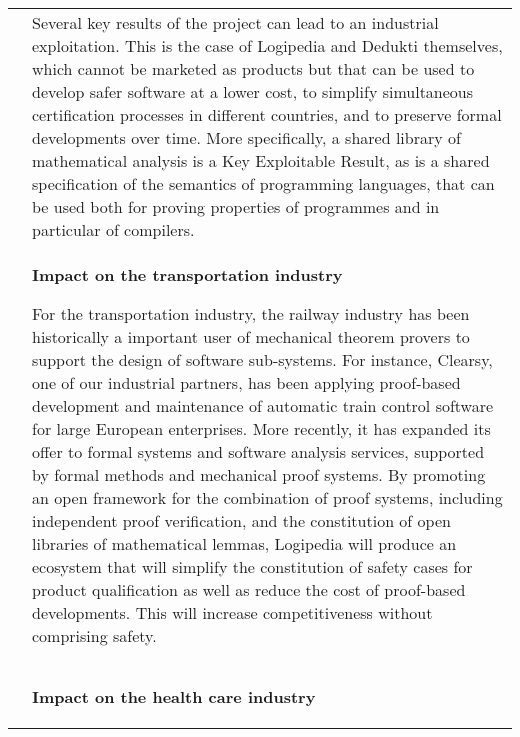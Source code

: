 \begin{longtable}{|p{}|p{}|}
&
\hspace{0.4cm}
Several key results of the project can lead to an industrial
exploitation. This is the case of Logipedia and Dedukti themselves,
which cannot be marketed as products but that can be used to develop safer
software at a lower cost, to simplify simultaneous certification
processes in different countries, and to preserve formal developments
over time. More specifically, a shared library of mathematical analysis is a Key
Exploitable Result, as is a shared specification of the semantics of
programming languages, that can be used both for proving properties of
programmes and in particular of compilers.\\
&
\vspace{-0.5cm}
\begin{framed}
{\bf\large Impact on the transportation industry}

For the transportation industry, the railway industry has been
historically a important user of mechanical theorem provers to support the
design of software sub-systems. For instance, Clearsy, one of our
industrial partners, has been
applying proof-based development and maintenance of automatic train
control software for large European enterprises. More recently, it has
expanded its offer to formal systems and software analysis services,
supported by formal methods and mechanical proof systems.
By promoting an open framework for the combination of proof systems,
including independent proof verification, and the constitution of open
libraries of mathematical lemmas, Logipedia will produce an ecosystem
that will simplify the constitution of safety cases for product
qualification as well as reduce the cost of proof-based developments.
This will increase competitiveness without comprising safety.
\end{framed}\\
&
\vspace{-0.5cm}
\begin{framed}
{\bf\large Impact on the health care industry}


\end{framed}
\end{longtable}

